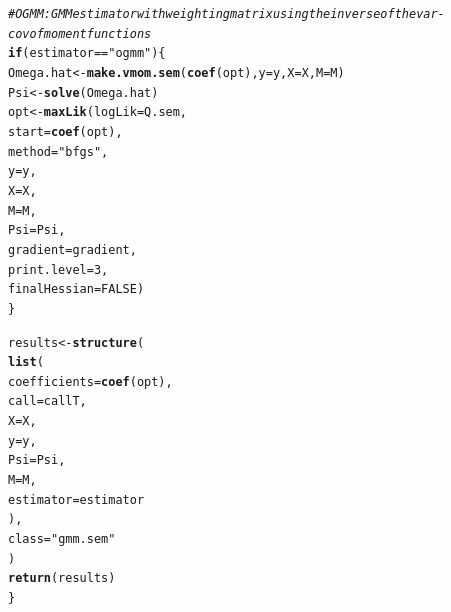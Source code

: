 \documentclass[english,12pt]{book}\usepackage[]{graphicx}\usepackage[]{xcolor}
\makeatletter
\newcommand{\hlnum}[1]{\textcolor[rgb]{0.686,0.059,0.569}{#1}}%
\newcommand{\hlstr}[1]{\textcolor[rgb]{0.192,0.494,0.8}{#1}}%
\newcommand{\hlcom}[1]{\textcolor[rgb]{0.678,0.584,0.686}{\textit{#1}}}%
\newcommand{\hlopt}[1]{\textcolor[rgb]{0,0,0}{#1}}%
\newcommand{\hlstd}[1]{\textcolor[rgb]{0.345,0.345,0.345}{#1}}%
\newcommand{\hlkwa}[1]{\textcolor[rgb]{0.161,0.373,0.58}{\textbf{#1}}}%
\newcommand{\hlkwb}[1]{\textcolor[rgb]{0.69,0.353,0.396}{#1}}%
\newcommand{\hlkwc}[1]{\textcolor[rgb]{0.333,0.667,0.333}{#1}}%
\newcommand{\hlkwd}[1]{\textcolor[rgb]{0.737,0.353,0.396}{\textbf{#1}}}%
\newenvironment{kframe}{%
 \def\at@end@of@kframe{}%
 \ifinner\ifhmode%
  \def\at@end@of@kframe{\end{minipage}}%
  \begin{minipage}{\columnwidth}%
 \fi\fi%
 \def\FrameCommand##1{\hskip\@totalleftmargin \hskip-\fboxsep
 \colorbox{shadecolor}{##1}\hskip-\fboxsep
     \hskip-\linewidth \hskip-\@totalleftmargin \hskip\columnwidth}%
 \MakeFramed {\advance\hsize-\width
   \@totalleftmargin\z@ \linewidth\hsize
   \@setminipage}}%
 {\par\unskip\endMakeFramed%
 \at@end@of@kframe}
\newenvironment{knitrout}{}{} %
\makeatother
\begin{document}
\begin{knitrout}
\begin{kframe}
\begin{alltt}
  \hlcom{# OGMM: GMM estimator with weighting matrix using the inverse of the var-cov of moment functions}
  \hlkwa{if} \hlstd{(estimator} \hlopt{==} \hlstr{"ogmm"}\hlstd{)\{}
    \hlstd{Omega.hat} \hlkwb{<-} \hlkwd{make.vmom.sem}\hlstd{(}\hlkwd{coef}\hlstd{(opt),} \hlkwc{y} \hlstd{= y,} \hlkwc{X} \hlstd{= X,} \hlkwc{M} \hlstd{= M)}
    \hlstd{Psi}       \hlkwb{<-} \hlkwd{solve}\hlstd{(Omega.hat)}
    \hlstd{opt}       \hlkwb{<-} \hlkwd{maxLik}\hlstd{(}\hlkwc{logLik} \hlstd{= Q.sem,}
                        \hlkwc{start} \hlstd{=} \hlkwd{coef}\hlstd{(opt),}
                        \hlkwc{method} \hlstd{=} \hlstr{"bfgs"}\hlstd{,}
                        \hlkwc{y} \hlstd{= y,}
                        \hlkwc{X} \hlstd{= X,}
                        \hlkwc{M} \hlstd{= M,}
                        \hlkwc{Psi} \hlstd{= Psi,}
                        \hlkwc{gradient} \hlstd{= gradient,}
                        \hlkwc{print.level} \hlstd{=} \hlnum{3}\hlstd{,}
                        \hlkwc{finalHessian} \hlstd{=} \hlnum{FALSE}\hlstd{)}
  \hlstd{\}}

  \hlstd{results} \hlkwb{<-} \hlkwd{structure}\hlstd{(}
    \hlkwd{list}\hlstd{(}
      \hlkwc{coefficients} \hlstd{=} \hlkwd{coef}\hlstd{(opt),}
      \hlkwc{call}         \hlstd{= callT,}
      \hlkwc{X}            \hlstd{= X,}
      \hlkwc{y}            \hlstd{= y,}
      \hlkwc{Psi}          \hlstd{= Psi,}
      \hlkwc{M}            \hlstd{= M,}
      \hlkwc{estimator}    \hlstd{= estimator}
    \hlstd{),}
    \hlkwc{class} \hlstd{=} \hlstr{"gmm.sem"}
  \hlstd{)}
  \hlkwd{return}\hlstd{(results)}
\hlstd{\}}
\end{alltt}
\end{kframe}
\end{knitrout}
\end{document}
